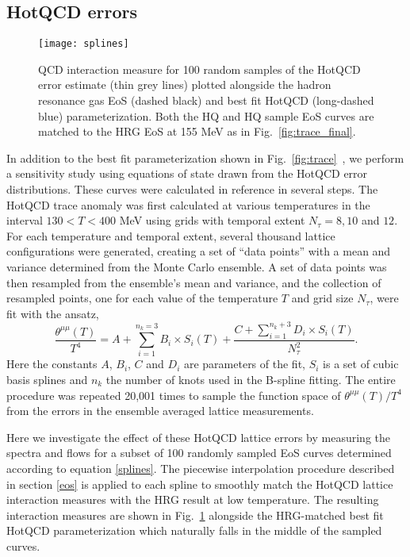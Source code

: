 \documentclass[aps,prc,reprint,amsmath,nofootinbib,superscriptaddress]{revtex4-1}
\begin{document}
\subsection{HotQCD errors}
\label{errors}

\begin{figure}[t]
  \texttt{[image: splines]}
  \caption{
    \label{fig:splines}
    QCD interaction measure for 100 random samples of the HotQCD error estimate (thin grey lines) plotted alongside the hadron resonance gas EoS (dashed black) and 
    best fit HotQCD (long-dashed blue) parameterization. Both the HQ and HQ sample EoS curves are matched to the HRG EoS at 155 MeV as in Fig.~\ref{fig:trace_final}.
  }
\end{figure}

In addition to the best fit parameterization shown in Fig.~\ref{fig:trace}~, we perform a sensitivity study using equations of state drawn from the HotQCD error distributions.  These curves were calculated in reference \cite{Bazavov:2014pvz} in several steps. The HotQCD trace anomaly was first calculated at various temperatures in the interval $130 < T < 400$ MeV using grids with temporal extent $N_\tau = 8,10$ and $12$.
For each temperature and temporal extent, several thousand lattice configurations were generated, creating a set of ``data points'' with a mean and variance determined from the Monte Carlo ensemble. 
A set of data points was then resampled from the ensemble's mean and variance, and the collection of resampled points, one for each value of the temperature $T$ and grid size $N_\tau$, were fit with the ansatz,
\begin{equation}
 \label{splines}
 \frac{\theta^{\mu\mu}(T)}{T^4} = A + \sum\limits_{i=1}^{n_k=3} B_i \times S_i(T) + \frac{C + \sum_{i=1}^{n_k + 3} D_i \times S_i(T)}{N_\tau^2}.
\end{equation}
Here the constants $A$, $B_i$, $C$ and $D_i$ are parameters of the fit, $S_i$ is a set of cubic basis splines and $n_k$ the number of knots used in the B-spline fitting. 
The entire procedure was repeated 20,001 times to sample the function space of $\theta^{\mu\mu}(T)/T^4$ from the errors in the ensemble averaged lattice measurements.

Here we investigate the effect of these HotQCD lattice errors by measuring the spectra and flows for a subset of 100 randomly sampled EoS curves determined according to equation \eqref{splines}.
The piecewise interpolation procedure described in section \ref{eos} is applied to each spline to smoothly match the HotQCD lattice interaction measures with the HRG result at low temperature. 
The resulting interaction measures are shown in Fig.~\ref{fig:splines} alongside the HRG-matched best fit HotQCD parameterization which naturally falls in the middle of the sampled curves.  
\end{document}
